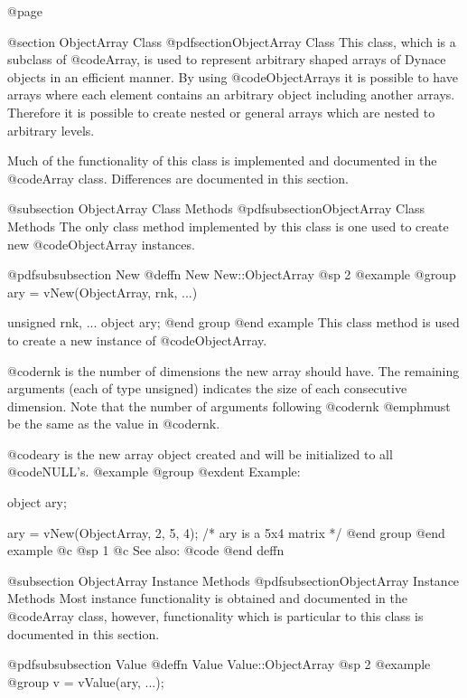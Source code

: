 @page

@section  ObjectArray Class
@pdfsection{ObjectArray Class}
This class, which is a subclass of @code{Array}, is used to represent
arbitrary shaped arrays of Dynace objects in an efficient manner.  By
using @code{ObjectArray}s it is possible to have arrays where each
element contains an arbitrary object including another arrays.
Therefore it is possible to create nested or general arrays which are
nested to arbitrary levels.


Much of the functionality of this class is implemented and documented in
the @code{Array} class.  Differences are documented in this section.



@subsection ObjectArray Class Methods
@pdfsubsection{ObjectArray Class Methods}
The only class method implemented by this class is one used to create
new @code{ObjectArray} instances.






@pdfsubsubsection {New}
@deffn {New} New::ObjectArray
@sp 2
@example
@group
ary = vNew(ObjectArray, rnk, ...)

unsigned  rnk, ...
object    ary;
@end group
@end example
This class method is used to create a new instance of @code{ObjectArray}.

@code{rnk} is the number of dimensions the new array should have.
The remaining arguments (each of type unsigned) indicates the size of
each consecutive dimension.  Note that the number of arguments following
@code{rnk} @emph{must} be the same as the value in @code{rnk}.

@code{ary} is the new array object created and will be initialized to all
@code{NULL}'s.
@example
@group
@exdent Example:

object  ary;

ary = vNew(ObjectArray, 2, 5, 4);
/*  ary is a 5x4 matrix  */
@end group
@end example
@c @sp 1
@c See also:  @code{}
@end deffn



@subsection ObjectArray Instance Methods
@pdfsubsection{ObjectArray Instance Methods}
Most instance functionality is obtained and documented in the @code{Array}
class, however, functionality which is particular to this class is documented
in this section.





@pdfsubsubsection {Value}
@deffn {Value} Value::ObjectArray
@sp 2
@example
@group
v = vValue(ary, ...);

